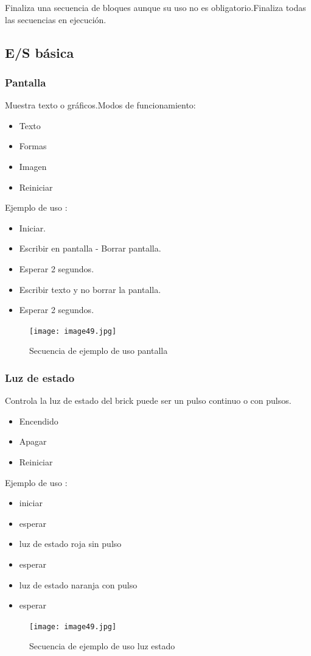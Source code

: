 \documentclass[12pt,a4paper]{article}
\begin{document}
Finaliza una secuencia de bloques aunque su uso no es obligatorio.Finaliza todas
las secuencias en ejecución.

\subsection{E/S básica}
\subsubsection{Pantalla}
Muestra texto o gráficos.Modos de funcionamiento:
\begin{itemize}
\item Texto
\item Formas
\item Imagen
\item Reiniciar
\end{itemize}
Ejemplo de uso :
\begin{itemize}
\item Iniciar.
\item Escribir en pantalla - Borrar pantalla.
\item Esperar 2 segundos.
\item Escribir texto y no borrar la pantalla.
\item Esperar 2 segundos.
\end{itemize}
\begin{figure}[H]
	\caption{Secuencia de ejemplo de uso pantalla}
	\texttt{[image: image49.jpg]}
	\centering
\end{figure}
\subsubsection{Luz de estado}
Controla la luz de estado del brick puede ser un pulso continuo o con pulsos.
\begin{itemize}
\item Encendido
\item Apagar
\item Reiniciar
\end{itemize}
Ejemplo de uso :
\begin{itemize}
\item iniciar
\item esperar
\item luz de estado roja sin pulso
\item esperar
\item luz de estado naranja con pulso
\item esperar
\end{itemize}
\begin{figure}[H]
	\caption{Secuencia de ejemplo de uso luz estado }
	\texttt{[image: image49.jpg]}
	\centering
\end{figure}
\end{document}
